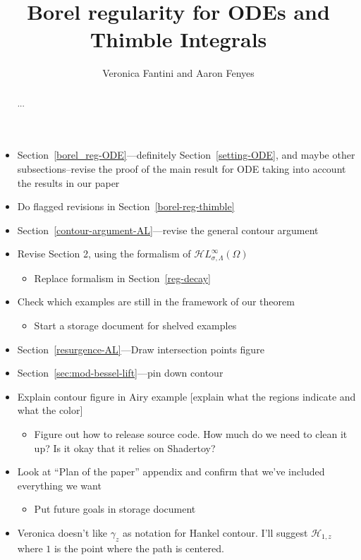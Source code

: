 \documentclass{article}
\title{Borel regularity for ODEs and Thimble Integrals}
\author{Veronica Fantini and Aaron Fenyes}
\newcommand{\singexp}[2]{\mathcal{H}L^\infty_{#1, #2}}
\theoremstyle{definition}
\theoremstyle{plain}
\newenvironment{brainstorm}{\color{violet}\begin{itemize}}{\end{itemize}\color{black}}
\begin{document}
\maketitle

\begin{abstract}
    ...
\end{abstract}
\tableofcontents

\begin{brainstorm}
    \item Section~\ref{borel_reg-ODE}---definitely Section~\ref{setting-ODE}, and maybe other subsections--revise the proof of the main result for ODE taking into account the results in our paper
    \item Do flagged revisions in Section~\ref{borel-reg-thimble}
    \item Section~\ref{contour-argument-AL}---revise the general contour argument
    \item Revise Section 2, using the formalism of $\singexp{\sigma}{\Lambda}(\Omega)$
    \begin{itemize}
    \item Replace formalism in Section~\ref{reg-decay}
    \end{itemize}
    \item Check which examples are still in the framework of our theorem
    \begin{itemize}
    \item Start a storage document for shelved examples
    \end{itemize}
    \item Section~\ref{resurgence-AL}---Draw intersection points figure
    \item Section~\ref{sec:mod-bessel-lift}---pin down contour
    \item Explain contour figure in Airy example [explain what the regions indicate and what the color]
    \begin{itemize}
    \item Figure out how to release source code. How much do we need to clean it up? Is it okay that it relies on Shadertoy?
    \end{itemize}
    \item Look at ``Plan of the paper'' appendix and confirm that we've included everything we want
    \begin{itemize}
    \item Put future goals in storage document
    \end{itemize}
    \item Veronica doesn't like $\gamma_z$ as notation for Hankel contour. I'll suggest $\mathcal{H}_{1,z}$ where $1$ is the point where the path is centered. 
\end{brainstorm}
\end{document}

